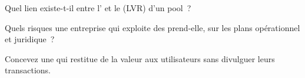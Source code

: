 \begin{interviewq}\label{iq:m3:maximal-extractable-value:4}
Quel lien existe-t-il entre l' et le  (LVR) d'un pool~?
\end{interviewq}

\begin{interviewq}\label{iq:m3:maximal-extractable-value:5}
Quels risques une entreprise qui exploite des  prend-elle, sur les plans opérationnel et juridique~?
\end{interviewq}

\begin{interviewq}\label{iq:m3:maximal-extractable-value:6}
Concevez une  qui restitue de la valeur aux utilisateurs sans divulguer leurs transactions.
\end{interviewq}
